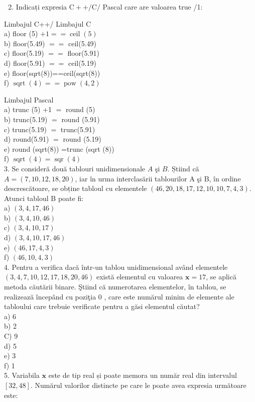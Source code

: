 \documentclass[10pt]{article}
\begin{document}
\begin{enumerate}
  \setcounter{enumi}{1}
  \item Indicați expresia $\mathrm{C}++/ \mathrm{C} /$ Pascal care are valoarea true /1:
\end{enumerate}

Limbajul C++/ Limbajul C\\
a) floor (5) $+1==\operatorname{ceil}(5)$\\
b) floor(5.49) $==$ ceil(5.49)\\
c) floor(5.19) $==$ floor(5.91)\\
d) floor(5.91) $==$ ceil(5.19)\\
e) floor(sqrt(8))==ceil(sqrt(8))\\
f) $\operatorname{sqrt}(4)==\operatorname{pow}(4,2)$

Limbajul Pascal\\
a) trunc (5) +1 $=$ round (5)\\
b) trunc(5.19) $=$ round (5.91)\\
c) trunc(5.19) $=$ trunc(5.91)\\
d) round(5.91) $=$ round (5.19)\\
e) round (sqrt(8)) =trunc (sqrt (8))\\
f) $\operatorname{sqrt}(4)=\operatorname{sqr}(4)$\\
3. Se consideră două tablouri unidimensionale $A$ şi $B$. Știind că $A=(7,10,12,18,20)$, iar în urma interclasării tablourilor A şi B, în ordine descrescătoare, se obține tabloul cu elementele $(46,20,18,17,12,10,10,7,4,3)$. Atunci tabloul B poate fi:\\
a) $(3,4,17,46)$\\
b) $(3,4,10,46)$\\
c) $(3,4,10,17)$\\
d) $(3,4,10,17,46)$\\
e) $(46,17,4,3)$\\
f) $(46,10,4,3)$\\
4. Pentru a verifica dacă într-un tablou unidimensional având elementele $(3,4,7,10,12,17,18,20,46)$ există elementul cu valoarea $\mathbf{x}=17$, se aplică metoda căutării binare. Ştiind că numerotarea elementelor, în tablou, se realizează începând cu poziţia 0 , care este numărul minim de elemente ale tabloului care trebuie verificate pentru a găsi elementul căutat?\\
a) 6\\
b) 2\\
C) 9\\
d) 5\\
e) 3\\
f) 1\\
5. Variabila $\mathbf{x}$ este de tip real și poate memora un număr real din intervalul $[32,48]$. Numărul valorilor distincte pe care le poate avea expresia următoare este:
\end{document}
